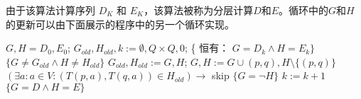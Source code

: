 由于该算法计算序列 $D_K$ 和 $E_K$，该算法被称为分层计算$D$和$E$。循环中的$G$和$H$的更新可以由下面展示的程序中的另一个循环实现。
\begin{algorithm}
    \caption{}\label{al:ttt}
    \begin{algorithmic}[1]
        \State $G,H=D_0,E_0$;
        \State $G_{old},H_{old},k:=\emptyset ,Q \times Q,0$;
        \State \{ 恒有： $G=D_k \land H =E_k \}$
            \State $\{G \not= G_{old} \land H \not= H_{old} \}$
            \State $G_{old},H_{old}:=G,H$;
                    \State $G,H:=G \cup {(p,q)},H \setminus \{(p,q)\}$
                \Else 
                    \State $(\exists a:a \in V : (T(p,a),T(q,a)) \in H_{old} ) \longrightarrow $ skip
                \EndIf
            \EndFor %
            \State $\{G=\neg H\}$
            \State $k:=k+1$
        \Until $ \{ G=D \land H=E \}$
    \end{algorithmic}
\end{algorithm}

